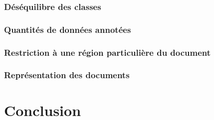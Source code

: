 \subsubsection{Déséquilibre des classes}
\subsubsection{Quantités de données annotées}
\subsubsection{Restriction à une région particulière du document}
\subsubsection{Représentation des documents}

\section{Conclusion}
\label{sec:sensresultat:conclusion}